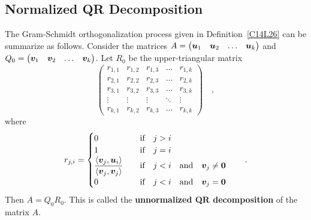 \subsection{Normalized QR Decomposition}\label{C14L31}

The Gram-Schmidt orthogonalization process given in
Definition~\ref{C14L26} can be summarize as follows.
Consider the  matrices
$A = \begin{pmatrix} \bm{u}_1 & \bm{u}_2 & \ldots & \bm{u}_k\end{pmatrix}$
and
$Q_0 = \begin{pmatrix} \bm{v}_1 & \bm{v}_2 & \ldots & \bm{v}_k\end{pmatrix}$.
Let $R_0$ be the  upper-triangular matrix
\[
\begin{pmatrix}
r_{1,1} & r_{1,2} & r_{1,3} & \ldots & r_{1,k} \\
r_{2,1} & r_{2,2} & r_{2,3} & \ldots & r_{2,k} \\
r_{3,1} & r_{3,2} & r_{3,3} & \ldots & r_{3,k} \\
\vdots & \vdots & \vdots & \ddots & \vdots \\
r_{k,1} & r_{k,2} & r_{k,3} & \ldots & r_{k,k}
\end{pmatrix} \quad ,
\]
where
\[
r_{j,i} = \begin{cases}
0 & \quad \text{if} \quad j > i \\    
1 & \quad \text{if} \quad j = i \\    
\displaystyle \frac{\left\langle{\bm{v}_j} , {\bm{u}_i}\right\rangle}{\left\langle{\bm{v}_j} , {\bm{v}_j}\right\rangle}
& \quad \text{if} \quad j < i \quad \text{and} \quad
\bm{v}_j \neq \bm{0} \\
0 & \quad \text{if} \quad j < i \quad \text{and} \quad
\bm{v}_j = \bm{0}
\end{cases} \qquad .
\]  
Then $A = Q_0 R_0$.  This is called the
{\bfseries unnormalized QR decomposition} of the matrix $A$. 

